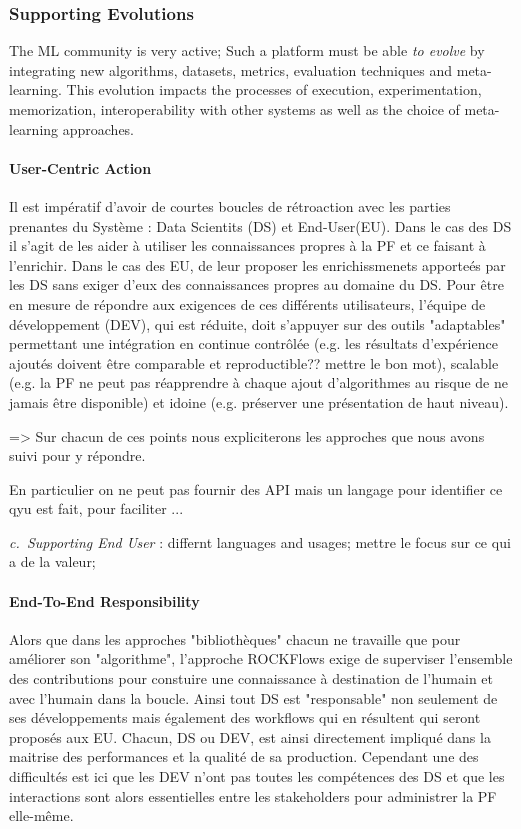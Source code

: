 \documentclass{llncs}
\newcounter{NoReq}
\newcommand{\req}[3]{\refstepcounter{NoReq} \textit{c.\theNoReq~{#2}}\label{#1} : {#3}}
\begin{document}
\subsubsection{Supporting Evolutions}

The ML community is very active; Such a platform must be able\textit{ to evolve }by integrating new algorithms, datasets, metrics, evaluation techniques and meta-learning. 
This evolution impacts the processes of execution, experimentation, memorization, interoperability with other systems as well as the choice of meta-learning approaches.

\paragraph{User-Centric Action }
Il est impératif d'avoir de courtes boucles de rétroaction avec les parties prenantes du Système : Data Scientits (DS) et End-User(EU). Dans le cas des DS il s'agit de les aider à utiliser les connaissances propres à la PF et ce faisant à l'enrichir. Dans le cas des EU, de leur proposer les enrichissmenets apporteés par les DS sans exiger d'eux des connaissances propres au domaine du DS. 
Pour être en mesure de répondre aux exigences de ces différents utilisateurs, l'équipe de développement (DEV), qui est réduite, doit s'appuyer sur des outils "adaptables" permettant une intégration en continue contrôlée (e.g. les résultats d'expérience ajoutés doivent être comparable et reproductible?? mettre le bon mot), scalable (e.g. la PF ne peut pas réapprendre à chaque ajout d'algorithmes au risque de ne jamais être disponible) et idoine (e.g. préserver une présentation de haut niveau).

=> Sur chacun de ces points nous expliciterons les approches que nous avons suivi pour y répondre.

En particulier on ne peut pas fournir des API mais un langage pour identifier ce qyu est fait, pour faciliter ...

\req{EndUser}{Supporting End User}{ differnt languages and usages; mettre le focus sur ce qui a de la valeur; 
}

\paragraph{End-To-End Responsibility}
Alors que dans les approches "bibliothèques" chacun ne travaille que pour améliorer son "algorithme", l'approche ROCKFlows exige de superviser l'ensemble des contributions pour constuire une connaissance à destination de l'humain et avec l'humain dans la boucle.
Ainsi tout DS est "responsable" non seulement de ses développements mais également des workflows qui en résultent qui seront proposés aux EU. Chacun, DS ou DEV, est ainsi directement impliqué dans la maitrise des performances et la qualité de sa production. 
Cependant une des difficultés est ici que les DEV n'ont pas toutes les compétences des DS et que les interactions sont alors essentielles entre les stakeholders pour administrer la PF elle-même.
\end{document}
